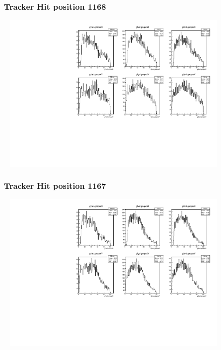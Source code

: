 \documentclass[slidestop,compress,mathserif]{beamer}
\begin{document}
\begin{frame}\frametitle{Tracker Hit position 1168}
	 \includegraphics[width=12cm,height=8cm]{Tracker_Hit_position_1168.pdf}
\end{frame}
\begin{frame}\frametitle{Tracker Hit position 1167}
	 \includegraphics[width=12cm,height=8cm]{Tracker_Hit_position_1167.pdf}
\end{frame}
\end{document}
